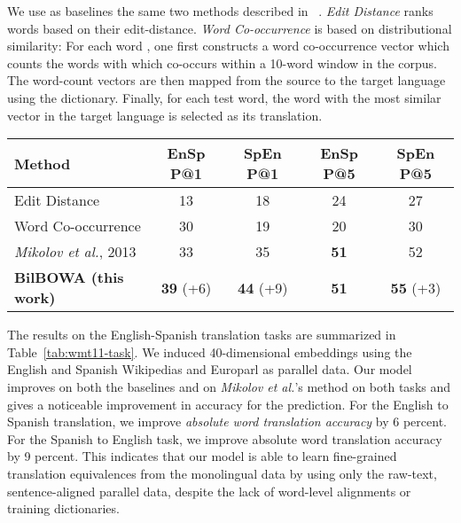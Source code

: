 \documentclass[10pt]{article}
\newcommand\bld[1]{\textbf{#1}}
\begin{document}
We use as baselines the same two methods described in ~\cite{mikolov2013exploiting}. 
\emph{Edit Distance} ranks words based on their edit-distance. \emph{Word Co-occurrence} is
based on distributional similarity: For each word , one first constructs a
word co-occurrence vector which counts the words with which  co-occurs
within a 10-word window in the corpus. The word-count vectors are then mapped from the source
to the target language using the dictionary. Finally, for each test word, the word
with the most similar vector in the target language is selected as its translation.


\begin{table*}
  \small
  \centering 
  \begin{tabular}{l|c|c||c|c}
    \hline
    \bld{Method} & \bld{EnSp P@1} &  \bld{SpEn P@1} &  \bld{EnSp P@5} & \bld{SpEn P@5} \\
    \hline
    Edit Distance & 13 & 18 & 24 & 27 \\
    Word Co-occurrence & 30 & 19 & 20 & 30 \\
   \emph{Mikolov et al.}, 2013 & 33 & 35 & \bld{51} & 52 \\
   \textbf{BilBOWA (this work)} & \bld{39} (+6) & \bld{44} (+9) & \bld{51} & \bld{55} (+3) \\
   \hline
  \end{tabular}
  \caption{Results for the translation task measured as word translation
  accuracy (out of 100, higher is better) evaluated on the top-1 and top-5 words 
  as ranked by the method. Cross-lingual embeddings are induced and distance in 
  the embedded space are used to select word translation pairs.  indicates 
  improvement in absolute precision over the previous state-of-the-art on this 
  task~\cite{mikolov2013exploiting}. }
  \label{tab:wmt11-task}
\end{table*}

The results on the English-Spanish translation tasks are summarized in
Table~\ref{tab:wmt11-task}. We induced 40-dimensional embeddings using the
English and Spanish Wikipedias and Europarl as parallel data. Our model
improves on both the baselines and on \emph{Mikolov et al.}'s method on both
tasks and gives a noticeable improvement in accuracy for the  prediction.
For the English to Spanish translation, we improve \emph{absolute word
translation accuracy} by 6 percent. For the Spanish to English task, we improve
absolute word translation accuracy by 9 percent. This indicates that our model
is able to learn fine-grained translation equivalences from the monolingual
data by using only the raw-text, sentence-aligned parallel data, despite the
lack of word-level alignments or training dictionaries.
\end{document}
